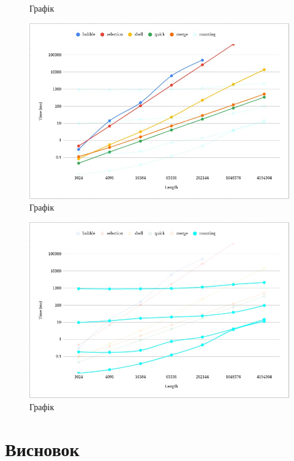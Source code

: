 \documentclass{article}
\begin{document}
\begin{normalsize}
\begin{figure}[H]
			\caption{Графік}
		\end{figure}
	
		\begin{figure}[H]
			\centering
			\includegraphics[scale=0.5]{2}	
			\caption{Графік}
		\end{figure}
		
		\begin{figure}[H]
			\centering
			\includegraphics[scale=0.5]{3}	
			\caption{Графік}
		\end{figure}
		
		\section*{Висновок}
		
		
	\end{normalsize}
\end{document}

